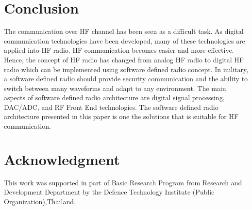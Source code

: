 \documentclass[conference]{IEEEtran}
\begin{document}
\section{Conclusion}
The communication over HF channel has been seen as a difficult task. As digital communication technologies have been developed, many of these technologies are applied into HF radio. HF communication becomes easier and more effective. Hence, the concept of HF radio has changed from analog HF radio to digital HF radio which can be implemented using software defined radio concept. In military, a software defined radio should provide security communication and the ability to switch between many waveforms and adapt to any environment. The main aspects of software defined radio architecture are digital signal processing, DAC/ADC, and RF Front End technologies. The software defined radio architecture presented in this paper is one the solutions that is suitable for HF communication. 




\section*{Acknowledgment}
This work was supported in part of Basic Research
Program from Research and Development Department by the
Defence Technology Institute (Public Organization),Thailand.



\end{document}
